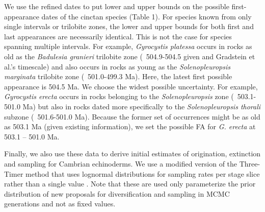 \documentclass{article}
\begin{document}
We use the refined dates to put lower and upper bounds on the possible first-appearance dates of the cinctan species (Table 1). For species known from only single intervals or trilobite zones, the lower and upper bounds for both first and last appearances are necessarily identical. This is not the case for species spanning multiple intervals. For example, \textit{Gyrocystis platessa} occurs in rocks as old as the \textit{Badulesia granieri} trilobite zone (~504.9-504.5 given \cite{Geyer2019} and Gradstein et al.’s timescale) and also occurs in rocks as young as the \textit{Solenopleuropsis marginata} trilobite zone (~501.0-499.3 Ma).  Here, the latest first possible appearance is 504.5 Ma. We choose the widest possible uncertainty. For example, \textit{Gyrocystis erecta} occurs in rocks belonging to the \textit{Solenopleuropsis} zone (~503.1-501.0 Ma) but also in rocks dated more specifically to the \textit{Solenopleuropsis thorali} subzone (~501.6-501.0 Ma). Because the former set of occurrences might be as old as 503.1 Ma (given existing information), we set the possible FA for \textit{G. erecta} at 503.1 – 501.0 Ma.

Finally, we also use these data to derive initial estimates of origination, extinction and sampling for Cambrian echinoderms. We use a modified version of the Three-Timer method \citep{Alroy2015} that uses lognormal distributions for sampling rates per stage slice rather than a single value \citep{Wagner2013}. Note that these are used only parameterize the prior distribution of new proposals for diversification and sampling in MCMC generations and not as fixed values.
\end{document}
